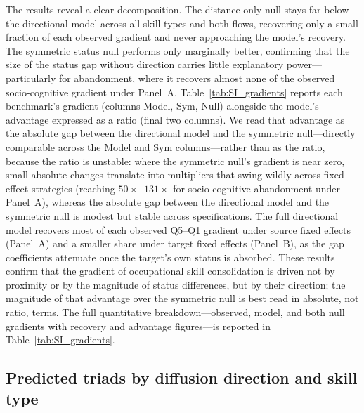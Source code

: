 \documentclass[11pt, letterpaper]{article} %
\begin{document}
The results reveal a clear decomposition. The distance-only null stays far below the directional model across all skill types and both flows, recovering only a small fraction of each observed gradient and never approaching the model's recovery. The symmetric status null performs only marginally better, confirming that the size of the status gap without direction carries little explanatory power---particularly for abandonment, where it recovers almost none of the observed socio-cognitive gradient under Panel~A. Table~\ref{tab:SI_gradients} reports each benchmark's gradient (columns Model, Sym, Null) alongside the model's advantage expressed as a ratio (final two columns). We read that advantage as the absolute gap between the directional model and the symmetric null---directly comparable across the Model and Sym columns---rather than as the ratio, because the ratio is unstable: where the symmetric null's gradient is near zero, small absolute changes translate into multipliers that swing wildly across fixed-effect strategies (reaching $50\times$--$131\times$ for socio-cognitive abandonment under Panel~A), whereas the absolute gap between the directional model and the symmetric null is modest but stable across specifications. The full directional model recovers most of each observed Q5--Q1 gradient under source fixed effects (Panel~A) and a smaller share under target fixed effects (Panel~B), as the gap coefficients attenuate once the target's own status is absorbed. These results confirm that the gradient of occupational skill consolidation is driven not by proximity or by the magnitude of status differences, but by their direction; the magnitude of that advantage over the symmetric null is best read in absolute, not ratio, terms. The full quantitative breakdown---observed, model, and both null gradients with recovery and advantage figures---is reported in Table~\ref{tab:SI_gradients}.
 

 
 

\subsection{Predicted triads by diffusion direction and skill type}
\label{sec:SI_triads}
\end{document}
